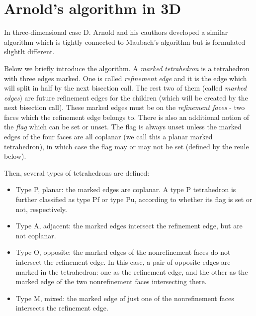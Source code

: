 \documentclass[a4paper,12pt]{amsart}
\numberwithin{equation}{section}
\begin{document}
\begin{center}
\end{center}

\section{Arnold's algorithm in 3D}

In three-dimensional case D. Arnold and his cauthors developed a similar algorithm which is tightly connected to Maubach's algorithm but is formulated slightlt different.

Below we briefly introduce the algorithm. 
A \textit{marked tetrahedron} is a tetrahedron with three edges marked. One is called \textit{refinement edge} and it is the edge which will split in half by the next bisection call. The rest two of them (called \textit{marked edges}) are future refinement edges for the children (which will be created by the next bisection call). These marked edges must be on the \textit{refinement faces} - two faces which the refinement edge belongs to. There is also an additional notion of the \textit{flag} which can be set or unset. The flag is always unset unless the marked edges of the
four faces are all coplanar (we call this a planar marked tetrahedron), in which case
the flag may or may not be set (defined by the reule below).

Then, several types of tetrahedrons are defined:
\begin{itemize}
\item  Type P, planar: the marked edges are coplanar. A type P tetrahedron is further 		classified as type Pf or type Pu, according to whether its flag is set or not, 			respectively.
\item Type A, adjacent: the marked edges intersect the refinement edge, but are
	not coplanar.
\item Type O, opposite: the marked edges of the nonrefinement faces do not intersect 		the refinement edge. In this case, a pair of opposite edges are marked in the 			tetrahedron: one as the refinement edge, and the other as the marked edge of the 		two nonrefinement faces intersecting there.
\item Type M, mixed: the marked edge of just one of the nonrefinement faces
	intersects the refinement edge.
\end{itemize}
\end{document}
